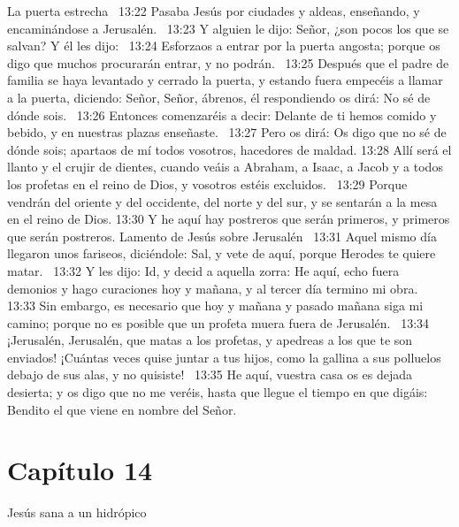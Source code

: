 La puerta estrecha   
13:22 Pasaba Jesús por ciudades y aldeas, enseñando, y encaminándose a Jerusalén.  
13:23 Y alguien le dijo: Señor, ¿son pocos los que se salvan? Y él les dijo:  
13:24 Esforzaos a entrar por la puerta angosta; porque os digo que muchos procurarán entrar, y no podrán.  
13:25 Después que el padre de familia se haya levantado y cerrado la puerta, y estando fuera empecéis a llamar a la puerta, diciendo: Señor, Señor, ábrenos, él respondiendo os dirá: No sé de dónde sois.  
13:26 Entonces comenzaréis a decir: Delante de ti hemos comido y bebido, y en nuestras plazas enseñaste.  
13:27 Pero os dirá: Os digo que no sé de dónde sois; apartaos de mí todos vosotros, hacedores de maldad. 
13:28 Allí será el llanto y el crujir de dientes, cuando veáis a Abraham, a Isaac, a Jacob y a todos los profetas en el reino de Dios, y vosotros estéis excluidos.  
13:29 Porque vendrán del oriente y del occidente, del norte y del sur, y se sentarán a la mesa en el reino de Dios. 
13:30 Y he aquí hay postreros que serán primeros, y primeros que serán postreros. 
Lamento de Jesús sobre Jerusalén   
13:31 Aquel mismo día llegaron unos fariseos, diciéndole: Sal, y vete de aquí, porque Herodes te quiere matar.  
13:32 Y les dijo: Id, y decid a aquella zorra: He aquí, echo fuera demonios y hago curaciones hoy y mañana, y al tercer día termino mi obra.  
13:33 Sin embargo, es necesario que hoy y mañana y pasado mañana siga mi camino; porque no es posible que un profeta muera fuera de Jerusalén.  
13:34 ¡Jerusalén, Jerusalén, que matas a los profetas, y apedreas a los que te son enviados! ¡Cuántas veces quise juntar a tus hijos, como la gallina a sus polluelos debajo de sus alas, y no quisiste!  
13:35 He aquí, vuestra casa os es dejada desierta; y os digo que no me veréis, hasta que llegue el tiempo en que digáis: Bendito el que viene en nombre del Señor. 
\section*{Capítulo 14}
Jesús sana a un hidrópico  

